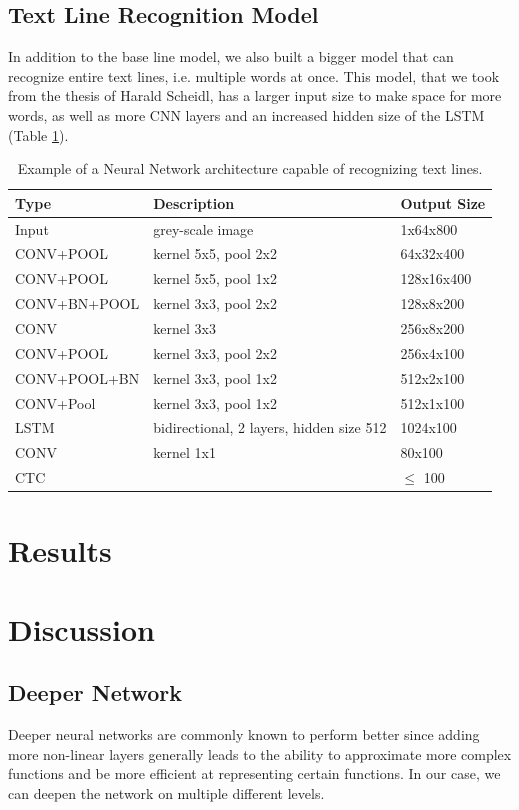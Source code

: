 \documentclass{article}
\begin{document}
\subsection{Text Line Recognition Model}
In addition to the base line model, we also built a bigger model that can recognize entire text lines, i.e. multiple words at once. This model, that we took from the thesis of Harald Scheidl\cite{ScheidlThesis}, has a larger input size to make space for more words, as well as more CNN layers and an increased hidden size of the LSTM (Table \ref{tab:BigModel}).
\begin{table}[H]
\centering
\begin{tabular}{l|l|l}
Type & Description & Output Size \\ \hline
Input & grey-scale image & 1x64x800 \\ \hline
CONV+POOL & kernel 5x5, pool 2x2 & 64x32x400 \\ \hline
CONV+POOL & kernel 5x5, pool 1x2 & 128x16x400 \\ \hline
CONV+BN+POOL & kernel 3x3, pool 2x2 & 128x8x200 \\ \hline
CONV & kernel 3x3 & 256x8x200 \\ \hline
CONV+POOL & kernel 3x3, pool 2x2 & 256x4x100 \\ \hline
CONV+POOL+BN & kernel 3x3, pool 1x2 & 512x2x100 \\ \hline
CONV+Pool & kernel 3x3, pool 1x2 & 512x1x100 \\ \hline
LSTM         & bidirectional, 2 layers, hidden size 512 & 1024x100 \\ \hline
CONV         & kernel 1x1 & 80x100 \\ \hline
CTC          &      & \(\leqslant\) 100 \\ \hline
\end{tabular}
\caption{Example of a Neural Network architecture capable of recognizing text lines.}
\label{tab:BigModel}
\end{table}

\newpage
\section{Results}

\newpage
\section{Discussion}
\subsection{Deeper Network}
Deeper neural networks are commonly known to perform better since adding more non-linear layers generally leads to the ability to approximate more complex functions and be more efficient at representing certain functions\cite{Bengio}\cite{LeRoux}\cite{Delalleau}\cite{Pascanu1}. In our case, we can deepen the network on multiple different levels.
\end{document}

